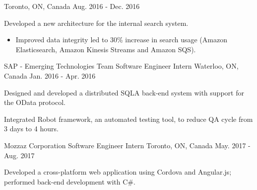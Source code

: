 \begin{cventries}
{Toronto, ON, Canada} %
{Aug. 2016 - Dec. 2016} %
{ %
\begin{cvitems}
\item {Developed a new architecture for the internal search system.}
\begin{itemize}[label=$\cdot$,leftmargin=0.7em]
\item {Improved data integrity led to 30\% increase in search usage (Amazon Elasticsearch, Amazon Kinesis Streams and Amazon SQS).}
\end{itemize}
\end{cvitems}
}
\cventry
{SAP - Emerging Technologies Team} %
{Software Engineer Intern} %
{Waterloo, ON, Canada} %
{Jan. 2016 - Apr. 2016} %
{ %
\begin{cvitems}
\item {Designed and developed a distributed SQLA back-end system with support for the OData protocol.}
\item {Integrated Robot framework, an automated testing tool, to reduce QA cycle from 3 days to 4 hours.}
\end{cvitems}
}
\cventry
{Mozzaz Corporation} %
{Software Engineer Intern} %
{Toronto, ON, Canada} %
{May. 2017 - Aug. 2017} %
{ %
\begin{cvitems}
\item {Developed a cross-platform web application using Cordova and Angular.js; performed back-end development with C\#.}
\end{cvitems}
}

\end{cventries}
